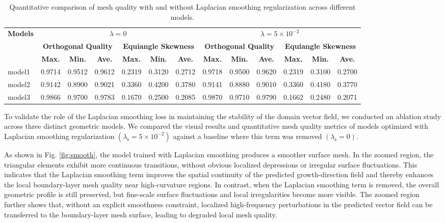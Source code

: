 \documentclass[%
 aip,
 amsmath,amssymb,
 reprint,%
nobibnotes,
]{revtex4-1}
\begin{document}
\begin{table}[htbp]
    \centering
    \caption{Quantitative comparison of mesh quality with and without Laplacian smoothing regularization across different models.}
    \label{tab:mesh_quality_pdeloss}
    \renewcommand{\arraystretch}{1.2}
    \begin{tabular}{l *{12}{c}}
        \toprule
        \multirow{3}{*}{\textbf{Models}} 
        & \multicolumn{6}{c}{\textbf{\(\lambda=0\)}} 
        & \multicolumn{6}{c}{\textbf{\(\lambda=5 \times 10^{-2}\)}} \\
        \cmidrule(lr){2-7} \cmidrule(lr){8-13}
        & \multicolumn{3}{c}{\textbf{Orthogonal Quality}} 
        & \multicolumn{3}{c}{\textbf{Equiangle Skewness}} 
        & \multicolumn{3}{c}{\textbf{Orthogonal Quality}} 
        & \multicolumn{3}{c}{\textbf{Equiangle Skewness}} \\
        \cmidrule(lr){2-4} \cmidrule(lr){5-7} 
        \cmidrule(lr){8-10} \cmidrule(lr){11-13}
        & \textbf{Max.} & \textbf{Min.} & \textbf{Ave.} 
        & \textbf{Max.} & \textbf{Min.} & \textbf{Ave.} 
        & \textbf{Max.} & \textbf{Min.} & \textbf{Ave.} 
        & \textbf{Max.} & \textbf{Min.} & \textbf{Ave.} \\
        \midrule
        model1  & 0.9714 & 0.9512 & 0.9612 & 0.2319 & 0.3120 & 0.2712 & 0.9718 & 0.9500 & 0.9620 & 0.2319 & 0.3100 & 0.2700 \\
        model2  & 0.9142 & 0.8900 & 0.9021 & 0.3360 & 0.4200 & 0.3780 & 0.9141 & 0.8880 & 0.9010 & 0.3360 & 0.4180 & 0.3770 \\
        model3  & 0.9866 & 0.9700 & 0.9783 & 0.1670 & 0.2500 & 0.2085 & 0.9870 & 0.9710 & 0.9790 & 0.1662 & 0.2480 & 0.2071 \\
        \bottomrule
    \end{tabular}
\end{table}

To validate the role of the Laplacian smoothing loss in maintaining the stability of the domain vector field, we conducted an ablation study across three distinct geometric models. We compared the visual results and quantitative mesh quality metrics of models optimized with Laplacian smoothing regularization \((\lambda_{\mathrm{s}} = 5 \times 10^{-2})\) against a baseline where this term was removed \((\lambda_{\mathrm{s}} = 0)\).

As shown in Fig. \ref{fig:smooth}, the model trained with Laplacian smoothing produces a smoother surface mesh. In the zoomed region, the triangular elements exhibit more continuous transitions, without obvious localized depressions or irregular surface fluctuations. This indicates that the Laplacian smoothing term improves the spatial continuity of the predicted growth-direction field and thereby enhances the local boundary-layer mesh quality near high-curvature regions. In contrast, when the Laplacian smoothing term is removed, the overall geometric profile is still preserved, but fine-scale surface fluctuations and local irregularities become more visible. The zoomed region further shows that, without an explicit smoothness constraint, localized high-frequency perturbations in the predicted vector field can be transferred to the boundary-layer mesh surface, leading to degraded local mesh quality.
\end{document}
